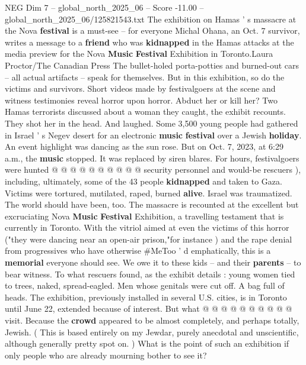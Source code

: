 \begin{textsample}{NEG Dim 7 – global\_north\_2025\_06 – Score -11.00 – global\_north\_2025\_06/125821543.txt}  \label{ex:f7_neg_071}
The exhibition on Hamas ' s massacre at the Nova \textbf{festival} is a must-see -- for everyone Michal Ohana, an Oct. 7 survivor, writes a message to a \textbf{friend} who was \textbf{kidnapped} in the Hamas attacks at the media preview for the Nova \textbf{Music} \textbf{Festival} Exhibition in Toronto.Laura Proctor/The Canadian Press The bullet-holed porta-potties and burned-out cars -- all actual artifacts -- speak for themselves.
But in this exhibition, so do the victims and survivors.
Short videos made by festivalgoers at the scene and witness testimonies reveal horror upon horror.
Abduct her or kill her?
Two Hamas terrorists discussed about a woman they caught, the exhibit recounts.
They shot her in the head.
And laughed.
Some 3,500 young people had gathered in Israel ' s Negev desert for an electronic \textbf{music} \textbf{festival} over a Jewish \textbf{holiday}.
An event highlight was dancing as the sun rose.
But on Oct. 7, 2023, at 6:29 a.m., the \textbf{music} stopped.
It was replaced by siren blares.
For hours, festivalgoers were hunted @ @ @ @ @ @ @ @ @ @ security personnel and would-be rescuers ), including, ultimately, some of the 43 people \textbf{kidnapped} and taken to Gaza.
Victims were tortured, mutilated, raped, burned \textbf{alive}.
Israel was traumatized.
The world should have been, too.
The massacre is recounted at the excellent but excruciating Nova \textbf{Music} \textbf{Festival} Exhibition, a travelling testament that is currently in Toronto.
With the vitriol aimed at even the victims of this horror ("they were dancing near an open-air prison,"for instance ) and the rape denial from progressives who have otherwise \#MeToo ' d emphatically, this is a \textbf{memorial} everyone should see.
We owe it to these kids -- and their \textbf{parents} -- to bear witness.
To what rescuers found, as the exhibit details : young women tied to trees, naked, spread-eagled.
Men whose genitals were cut off.
A bag full of heads.
The exhibition, previously installed in several U.S. cities, is in Toronto until June 22, extended because of interest.
But what @ @ @ @ @ @ @ @ @ @ visit.
Because the \textbf{crowd} appeared to be almost completely, and perhaps totally, Jewish. ( This is based entirely on my Jewdar, purely anecdotal and unscientific, although generally pretty spot on. ) What is the point of such an exhibition if only people who are already mourning bother to see it?

\end{textsample}
